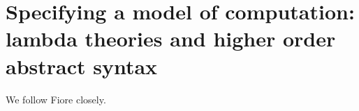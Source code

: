 \section{Specifying a model of computation: lambda theories and higher order abstract syntax}

We follow Fiore closely.
